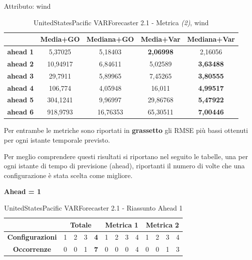 \documentclass[12pt,a4paper,oneside,openright]{book}
\begin{document}
\medskip

Attributo: wind \\ 

\begin{table}[H]
\centering
\begin{tabular}{|c|c|c|c|c|}
\hline
 & \textbf{Media+GO} & \textbf{Mediana+GO} & \textbf{Media+Var} & \textbf{Mediana+Var} \\
\hline
\textbf{ahead 1} & 5,37025 & 5,18403 & \textbf{2,06998} & 2,16056 \\
\hline
\textbf{ahead 2} & 10,94917 & 6,84611 & 5,02589 & \textbf{3,63488} \\
\hline
\textbf{ahead 3} & 29,7911 & 5,89965 & 7,45265 & \textbf{3,80555} \\
\hline
\textbf{ahead 4} & 106,774 & 4,05948 & 16,011 & \textbf{4,99517} \\
\hline
\textbf{ahead 5} & 304,1241 & 9,96997 & 29,86768 & \textbf{5,47922} \\
\hline
\textbf{ahead 6} & 918,9793 & 16,76353 & 65,30511 & \textbf{7,00446} \\
\hline
\end{tabular} 
\caption{UnitedStatesPacific VARForecaster 2.1 - Metrica \textit{(2)}, wind}
\end{table}
\newpage
Per entrambe le metriche sono riportati in \textbf{grassetto} gli RMSE più bassi ottenuti per ogni istante temporale previsto. 

Per meglio comprendere questi risultati si riportano nel seguito le tabelle, una per ogni istante di tempo di previsione (ahead), riportanti il numero di volte che una configurazione è stata scelta come migliore.

\medskip
\textbf{Ahead = 1}


\begin{table}[H]
\centering
\begin{tabular}{|c|c|c|c|c|c|c|c|c|c|c|c|c|}
\hline
 & \multicolumn{4}{|c|}{\textbf{Totale}} & \multicolumn{4}{|c|}{\textbf{Metrica 1}} & \multicolumn{4}{|c|}{\textbf{Metrica 2}} \\
\hline
\textbf{Configurazioni} & 1 & 2 & 3 & \textbf{4} & 1 & 2 & 3 & 4 & 1 & 2 & 3 & 4 \\
\hline
\textbf{Occorrenze} & 0 & 0 & 1 & \textbf{7} & 0 & 0 & 0 & 4 & 0 & 0 & 1 & 3\\
\hline
\end{tabular}
\caption{UnitedStatesPacific VARForecaster 2.1 - Riassunto Ahead 1}
\end{table}
\end{document}
